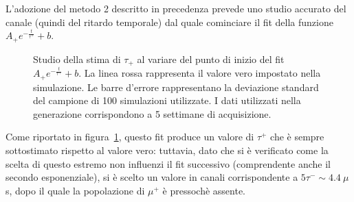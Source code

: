 \documentclass[10pt, oneside, a4paper]{article}   	%
\begin{document}
L'adozione del metodo 2 descritto in precedenza prevede uno studio accurato del canale (quindi del ritardo temporale) dal quale cominciare il fit della funzione $A_+e^{-\frac{t}{\tau^+}}+b$. 
\begin{figure}[b!]
  \centerline{}
  \caption{Studio della stima di $\tau_+$ al variare del punto di inizio del fit $A_+e^{-\frac{t}{\tau^+}}+b$. La linea rossa rappresenta il valore vero impostato nella simulazione. Le barre d'errore rappresentano la deviazione standard del campione di 100 simulazioni utilizzate. I dati utilizzati nella generazione corrispondono a 5 settimane di acquisizione.}
  \label{fig::tauplusstart}
\end{figure}
Come riportato in figura~\ref{fig::tauplusstart}, questo fit produce un valore di $\tau^+$ che è sempre sottostimato rispetto al valore vero: tuttavia, dato che si è verificato come la scelta di questo estremo non influenzi il fit successivo (comprendente anche il secondo esponenziale), si è scelto un valore in canali corrispondente a $5\tau^-\sim4.4\ \mu$s, dopo il quale la popolazione di $\mu^+$ è pressochè assente.
\end{document}

